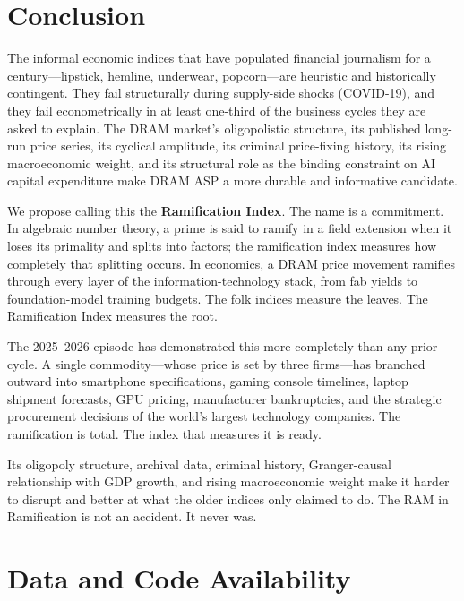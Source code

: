\documentclass[12pt]{article}
\theoremstyle{definition}
\begin{document}
\section{Conclusion}
\label{sec:conclusion}

The informal economic indices that have populated financial journalism for a century---lipstick, hemline, underwear, popcorn---are heuristic and historically contingent. They fail structurally during supply-side shocks (COVID-19), and they fail econometrically in at least one-third of the business cycles they are asked to explain. The DRAM market's oligopolistic structure, its published long-run price series, its cyclical amplitude, its criminal price-fixing history, its rising macroeconomic weight, and its structural role as the binding constraint on AI capital expenditure make DRAM ASP a more durable and informative candidate.

We propose calling this the \textbf{Ramification Index}. The name is a commitment. In algebraic number theory, a prime is said to ramify in a field extension when it loses its primality and splits into factors; the ramification index measures how completely that splitting occurs. In economics, a DRAM price movement ramifies through every layer of the information-technology stack, from fab yields to foundation-model training budgets. The folk indices measure the leaves. The Ramification Index measures the root.

The 2025--2026 episode has demonstrated this more completely than any prior cycle. A single commodity---whose price is set by three firms---has branched outward into smartphone specifications, gaming console timelines, laptop shipment forecasts, GPU pricing, manufacturer bankruptcies, and the strategic procurement decisions of the world's largest technology companies. The ramification is total. The index that measures it is ready.

Its oligopoly structure, archival data, criminal history, Granger-causal relationship with GDP growth, and rising macroeconomic weight make it harder to disrupt and better at what the older indices only claimed to do. The RAM in Ramification is not an accident. It never was.


\section*{Data and Code Availability}
\end{document}

